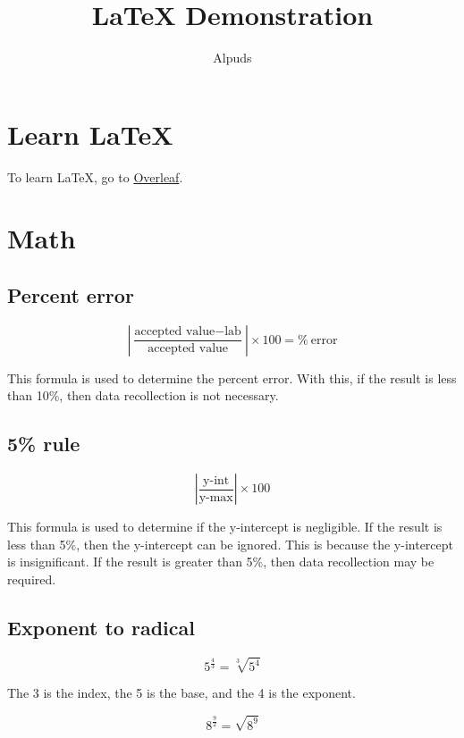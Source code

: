 \documentclass[letterpaper, 12pt]{article}
\begin{document}
\title{{\LaTeX} Demonstration}
\author{Alpuds}
\maketitle
\tableofcontents
\newpage

\section{Learn \LaTeX}
To learn \LaTeX, go to \href{https://www.overleaf.com/learn}{Overleaf}.

\section{Math}
\subsection{Percent error}
\begin{equation}
    \left|\frac{\text{accepted value} - \text{lab}}{\text{accepted value}}\right| \times 100 = \%\:\text{error}
\end{equation}

This formula is used to determine the percent error.
With this, if the result is less than 10\%, then data recollection is not necessary.

\subsection{5\% rule}
\begin{equation}
    \left|\frac{\text{y-int}}{\text{y-max}}\right| \times 100
\end{equation}

This formula is used to determine if the y-intercept is negligible.
If the result is less than 5\%, then the y-intercept can be ignored.
This is because the y-intercept is insignificant.
If the result is greater than 5\%, then data recollection may be required.

\subsection{Exponent to radical}
\begin{equation}
    5^\frac{4}{3} = \sqrt[3]{5^4}
\end{equation}

The 3 is the index, the 5 is the base, and the 4 is the exponent.

\begin{equation}
    8^\frac{9}{2} = \sqrt{8^9}
\end{equation}
\end{document}

